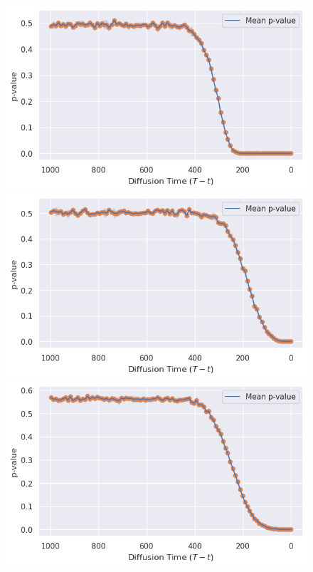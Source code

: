 \begin{figure}[!hb]
\centering
{}
  \includegraphics[width=\linewidth]{figs/plots/mnist_gausianity_test.png}
\endminipage%
  \includegraphics[width=\linewidth]{figs/plots/cifar10_gausianity_test.png}
  \label{subfig:cifar_ls}
\endminipage%
  \includegraphics[width=\linewidth]{figs/plots/imagenet64_gausianity_test.png}

\end{figure}
